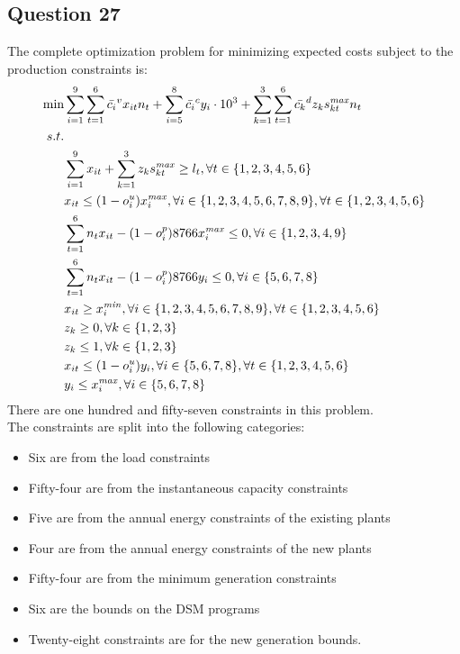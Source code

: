 \documentclass[11pt,a4paper]{article}
\begin{document}
\subsection*{Question 27}
The complete optimization problem for minimizing expected costs subject to the production constraints is:
\begin{align*}
	\min & \sum_{i=1}^{9}\sum_{t=1}^{6} \bar{c_{i}}^{v}x_{it}n_{t} + \sum_{i=5}^{8}\bar{c_{i}}^{c}y_{i}\cdot 10^3 + \sum_{k=1}^{3}\sum_{t=1}^{6}\bar{c_{k}}^{d}z_{k}s_{kt} ^{\text{\textit{max}}}n_{t}\\
	s.t. & \\
	& \sum_{i=1}^{9}x_{it} + \sum_{k=1}^{3}z_{k}s_{kt}^{\text{\textit{max}}}\geq l_{t},   \forall t\in{}\{1,2,3,4,5,6\}\\
	& x_{it} \leq (1 - o_{i}^{u})x_{i}^{\text{\textit{max}}},	\forall i \in{} \{1,2,3,4,5,6,7,8,9\}, \forall t\in{}\{1,2,3,4,5,6\}\\
	& \sum_{t=1}^{6}n_{t}x_{it} - (1 - o_{i}^{p})8766x_{i}^{\text{\textit{max}}} \leq 0, \forall i \in{} \{1,2,3,4,9\}\\
	& \sum_{t=1}^{6}n_{t}x_{it} - (1 - o_{i}^{p})8766y_{i} \leq 0, \forall i \in{} \{5,6,7,8\}\\
	& x_{it} \geq x_{i}^{\text{\textit{min}}},	\forall i \in{} \{1,2,3,4,5,6,7,8,9\}, \forall t\in{}\{1,2,3,4,5,6\}\\
	& z_{k} \geq 0, \forall k \in{} \{1,2,3\}\\
	& z_{k} \leq 1, \forall k \in{} \{1,2,3\}\\
	& x_{it} \leq (1 - o_{i}^{u})y_{i},	\forall i \in{} \{5,6,7,8\}, \forall t\in{}\{1,2,3,4,5,6\}\\
	& y_{i} \leq x_{i}^{\text{\textit{max}}}, \forall i \in{} \{5,6,7,8\}\\
\end{align*}
There are one hundred and fifty-seven constraints in this problem.\\
The constraints are split into the following categories:
\begin{itemize}
	\item Six are from the load constraints
	\item Fifty-four are from the instantaneous capacity constraints
	\item Five are from the annual energy constraints of the existing plants
	\item Four are from the annual energy constraints of the new plants
	\item Fifty-four are from the minimum generation constraints
	\item Six are the bounds on the DSM programs
	\item Twenty-eight constraints are for the new generation bounds.
\end{itemize}
\end{document}
